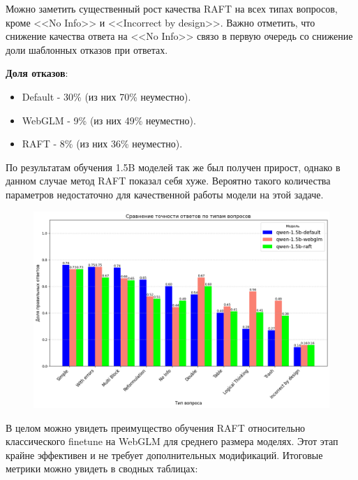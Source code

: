 Можно заметить существенный рост качества RAFT на всех типах вопросов, кроме <<No Info>> и <<Incorrect by design>>. Важно отметить, что снижение качества ответа на <<No Info>> связо в первую очередь со снижение доли шаблонных отказов при ответах.

\textbf{Доля отказов}: 
\begin{itemize}
    \item Default - 30\% (из них 70\% неуместно).

    \item WebGLM - 9\% (из них 49\% неуместно).

    \item RAFT - 8\% (из них 36\% неуместно).
\end{itemize}

По результатам обучения 1.5B моделей так же был получен прирост, однако в данном случае метод RAFT показал себя хуже. Вероятно такого количества параметров недостаточно для качественной работы модели на этой задаче.

\begin{figure}[ht!]
    \centering
    \includegraphics[scale=0.5]{images/1_5b_raft_result_new.png}
    \label{RAFT 1.5b}
\end{figure}

В целом можно увидеть преимущество обучения RAFT относительно классического finetune на WebGLM для среднего размера моделях. Этот этап крайне эффективен и не требует дополнительных модификаций. Итоговые метрики можно увидеть в сводных таблицах:  

